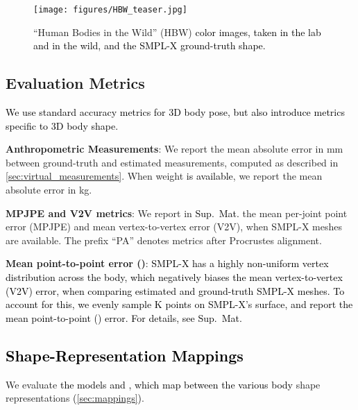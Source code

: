 \documentclass[10pt,twocolumn,letterpaper]{article}
\newcommand{\qheading}[1]{\noindent\textbf{#1}:}
\newcommand{\TODO}[1]{\xspace{\color{red} #1}\xspace}
\renewcommand{\TODO}[1]{\xspace{\color{black} #1}\xspace}
\newcommand{\AtoS}{\text{\mbox{A2S}}\xspace}
\newcommand{\StoA}{\text{\mbox{S2A}}\xspace}
\newcommand{\threeD}{3D\xspace}
\newcommand{\hbw}{\mbox{HBW}\xspace}
\newcommand{\smplx}{\mbox{SMPL-X}\xspace}
\newcommand{\smplX}{\smplx}
\newcommand{\groundtruth}{\mbox{ground-truth}\xspace}
\newcommand{\supmat}{{\mbox{\textcolor{black}{Sup.~Mat.}}}\xspace}
\newcommand{\vtov}{\mbox{V2V}\xspace}
\newcommand{\VtoV}{\vtov}
\newcommand{\vtovHD}{\mbox{}\xspace}
\newcommand{\mpjpe}{\mbox{MPJPE}\xspace}
\newcommand{\cameraready}[1]{\textcolor{Fuchsia}{{#1}}\xspace}
\renewcommand{\cameraready}[1]{\textcolor{black}{{#1}}\xspace}
\newcommand{\colorTERM}{blue}
\renewcommand{\colorTERM}{black}
\newcommand{\Measurements}[0]{{\color{\colorTERM}Anthropometric Measurements}\xspace}
\begin{document}
\begin{figure}\centering
    \texttt{[image: figures/HBW\_teaser.jpg]}
	\caption{``Human Bodies in the Wild'' (\hbw)
    \cameraready{color images, taken in the lab and in the wild,
    and the \smplx ground-truth shape.}
	}
	\label{fig:hbw}
\end{figure}
 
 \subsection{Evaluation Metrics} \label{sec:metrics}

\cameraready{We use standard accuracy metrics for \threeD body pose, but also introduce metrics specific to  \threeD body shape.} 

\qheading{\Measurements}
We report the mean absolute error in mm between \groundtruth and estimated measurements, computed 
as described in \cref{sec:virtual_measurements}. 
When weight \cameraready{is available}, we report the mean absolute error in kg. 

\qheading{\mpjpe and \VtoV metrics}
We
report in \supmat
the
mean per-joint point error (\mpjpe) and
mean vertex-to-vertex error (\vtov), when \smplx meshes are available. 
The prefix ``PA'' denotes metrics after Procrustes alignment. 


\qheading{Mean point-to-point error (\vtovHD)}
\TODO{
\cameraready{\smplx has a highly non-uniform vertex distribution across the body, which negatively biases the mean vertex-to-vertex (\VtoV) error, when comparing estimated and ground-truth \smplX meshes.
To account for this, we evenly sample K points on \smplX's surface,
and report the mean point-to-point (\vtovHD)
error.
For details, see \supmat}
}

 \subsection{\cameraready{Shape-Representation Mappings}}       \label{sec:exp_shape_est}


We evaluate \cameraready{the models \AtoS and \StoA, which map between the various body} shape representations \cameraready{(\cref{sec:mappings})}.
\end{document}
